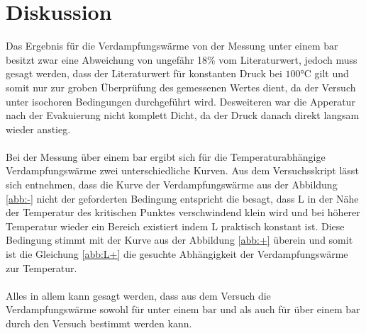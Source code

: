 \section{Diskussion}
\label{sec:Diskussion}
Das Ergebnis für die Verdampfungswärme von
der Messung unter einem $\si{\bar}$ besitzt
zwar eine Abweichung von ungefähr
18\% vom Literaturwert, jedoch muss gesagt werden, dass
der Literaturwert für konstanten Druck bei $100\si{\degreeCelsius}$
gilt und somit nur zur groben Überprüfung des gemessenen Wertes dient,
da der Versuch unter isochoren Bedingungen durchgeführt wird.
Desweiteren war die Apperatur nach der Evakuierung nicht komplett Dicht,
da der Druck danach direkt langsam wieder anstieg.\\
\\
Bei der Messung über einem $\si{\bar}$ ergibt sich für die
Temperaturabhängige Verdampfungswärme zwei unterschiedliche
Kurven. Aus dem Versuchsskript\cite{sample} lässt sich entnehmen, dass
die Kurve der Verdampfungswärme aus der Abbildung \ref{abb:-} nicht der
geforderten Bedingung entspricht die besagt, dass  L in der Nähe der
Temperatur des kritischen Punktes verschwindend klein wird und bei höherer
Temperatur wieder ein Bereich existiert indem L praktisch konstant ist.
Diese Bedingung stimmt mit der Kurve aus der Abbildung \ref{abb:+} überein
und  somit ist die Gleichung \eqref{abb:L+}
die gesuchte Abhängigkeit der Verdampfungswärme zur Temperatur.\\
\\
Alles in allem kann gesagt werden, dass aus dem Versuch die Verdampfungswärme
sowohl für unter einem $\si{\bar}$ und als auch für über einem $\si{\bar}$
durch den Versuch bestimmt werden kann.
